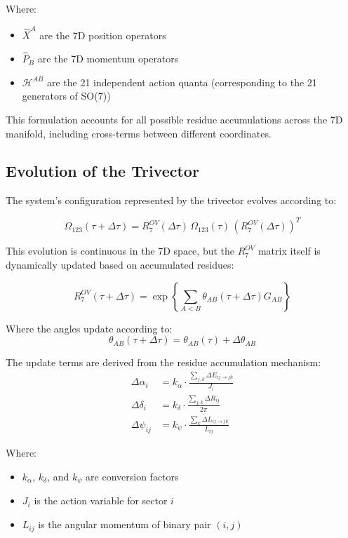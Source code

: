 \documentclass{article}
\begin{document}
Where:
\begin{itemize}
\item $\hat{X}^A$ are the 7D position operators
\item $\hat{P}_B$ are the 7D momentum operators
\item $\mathcal{H}^{AB}$ are the 21 independent action quanta (corresponding to the 21 generators of SO(7))
\end{itemize}

This formulation accounts for all possible residue accumulations across the 7D manifold, including cross-terms between different coordinates.

\subsection{Evolution of the Trivector}

The system's configuration represented by the trivector evolves according to:

\begin{equation}
\Omega_{123}(\tau+\Delta\tau) = R^{OV}_7(\Delta\tau) \, \Omega_{123}(\tau) \, (R^{OV}_7(\Delta\tau))^T
\end{equation}

This evolution is continuous in the 7D space, but the $R^{OV}_7$ matrix itself is dynamically updated based on accumulated residues:

\begin{equation}
R^{OV}_7(\tau+\Delta\tau) = \exp\left\{\sum_{A<B} \theta_{AB}(\tau+\Delta\tau) G_{AB}\right\}
\end{equation}

Where the angles update according to:
\begin{equation}
\theta_{AB}(\tau+\Delta\tau) = \theta_{AB}(\tau) + \Delta\theta_{AB}
\end{equation}

The update terms are derived from the residue accumulation mechanism:
\begin{align}
\Delta\alpha_i &= k_\alpha \cdot \frac{\sum_{j,k} \Delta E_{ij \to jk}}{J_i} \\
\Delta\delta_i &= k_\delta \cdot \frac{\sum_{j,k} \Delta R_{ij}}{2\pi} \\
\Delta\psi_{ij} &= k_\psi \cdot \frac{\sum_{k} \Delta L_{ij \to jk}}{L_{ij}}
\end{align}

Where:
\begin{itemize}
\item $k_\alpha$, $k_\delta$, and $k_\psi$ are conversion factors
\item $J_i$ is the action variable for sector $i$
\item $L_{ij}$ is the angular momentum of binary pair $(i,j)$
\end{itemize}
\end{document}
